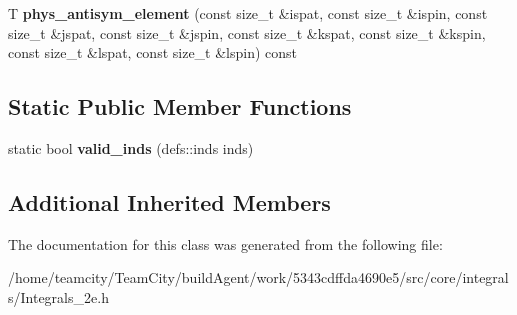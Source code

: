 \begin{DoxyCompactItemize}
\item 
T {\bfseries phys\+\_\+antisym\+\_\+element} (const size\+\_\+t \&ispat, const size\+\_\+t \&ispin, const size\+\_\+t \&jspat, const size\+\_\+t \&jspin, const size\+\_\+t \&kspat, const size\+\_\+t \&kspin, const size\+\_\+t \&lspat, const size\+\_\+t \&lspin) const \hypertarget{classIntegrals__2e_a79cf3ad586d2626e3d3b3b3b86ce41f9}{}\label{classIntegrals__2e_a79cf3ad586d2626e3d3b3b3b86ce41f9}

\end{DoxyCompactItemize}
\subsection*{Static Public Member Functions}
\begin{DoxyCompactItemize}
\item 
static bool {\bfseries valid\+\_\+inds} (defs\+::inds inds)\hypertarget{classIntegrals__2e_abee154b83d33485a1775937f307d7120}{}\label{classIntegrals__2e_abee154b83d33485a1775937f307d7120}

\end{DoxyCompactItemize}
\subsection*{Additional Inherited Members}


The documentation for this class was generated from the following file\+:\begin{DoxyCompactItemize}
\item 
/home/teamcity/\+Team\+City/build\+Agent/work/5343cdffda4690e5/src/core/integrals/Integrals\+\_\+2e.\+h\end{DoxyCompactItemize}
